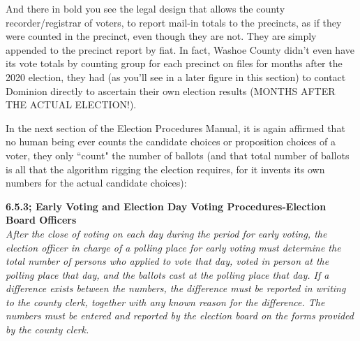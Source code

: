 \documentclass[preprint,13pt]{elsarticle}
\begin{document}
And there in bold you see the legal design that allows the county recorder/registrar of voters, to report mail-in totals to the precincts, as if they were counted in the precinct, even though they are not. They are simply appended to the precinct report by fiat. In fact, Washoe County didn't even have its vote totals by counting group for each precinct on files for months after the 2020 election, they had (as you'll see in a later figure in this section) to contact Dominion directly to ascertain their own election results (MONTHS AFTER THE ACTUAL ELECTION!).

In the next section of the Election Procedures Manual, it is again affirmed that no human being ever counts the candidate choices or proposition choices of a voter, they only ``count" the number of ballots (and that total number of ballots is all that the algorithm rigging the election requires, for it invents its own numbers for the actual candidate choices):

\textbf{6.5.3; Early Voting and Election Day Voting Procedures-Election Board Officers}\\
\textit{After the close of voting on each day during the period for early voting, the election officer in charge of a
polling place for early voting must determine the total number of persons who applied to vote that day, voted
in person at the polling place that day, and the ballots cast at the polling place that day. If a difference exists
between the numbers, the difference must be reported in writing to the county clerk, together with any
known reason for the difference. The numbers must be entered and reported by the election board on the
forms provided by the county clerk.}
\end{document}
